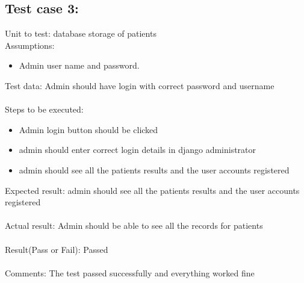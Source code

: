 \documentclass[oneside,12pt]{Classes/VTU}
\begin{document}
	\subsection{Test case 3:}
	Unit to test: database storage of patients\\
	Assumptions:
	\begin{itemize}
		\item Admin user name and password.
	\end{itemize}
	Test data: Admin should have login with correct password and username\\
	\\
	Steps to be executed:
	\begin{itemize}
		\item Admin login button should be clicked
		\item admin should enter correct login details in django administrator
		\item admin should see all the patients results and the user accounts registered
	\end{itemize}
	Expected result:  admin should see all the patients results and the user accounts registered\\
	\\
	Actual result: Admin should be able to see all the records for patients\\
	\\
	Result(Pass or Fail): Passed\\
	\\
	Comments: The test passed successfully and everything worked fine
	
\end{document}
